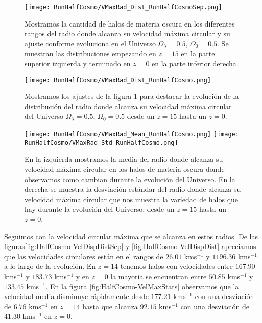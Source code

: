 \begin{figure}[H]
    \centering
    \texttt{[image: RunHalfCosmo/VMaxRad\_Dist\_RunHalfCosmoSep.png]}
    \caption[Radio donde se alcanza la velocidad máxima circular]{\footnotesize Mostramos la cantidad de halos de materia oscura en los diferentes rangos del radio donde alcanza su velocidad máxima circular y su ajuste conforme evoluciona en el Universo $\Omega_\lambda = 0.5$, $\Omega_0 = 0.5$. Se muestran las distribuciones empezando en $z=15$ en la parte superior izquierda y terminado en $z=0$ en la parte inferior derecha.}
    \label{fig:HalfCosmo-VMaxRadDistSep}
\end{figure}

\begin{figure}[H]
    \centering
    \texttt{[image: RunHalfCosmo/VMaxRad\_Dist\_RunHalfCosmo.png]}
    \caption[Distribución del radio donde se alcanza la velocidad máxima circular]{\footnotesize Mostramos los ajustes de la figura \ref{fig:HalfCosmo-VMaxRadDistSep} para destacar la evolución de la distribución del radio donde alcanza su velocidad máxima circular del Universo $\Omega_\lambda = 0.5$, $\Omega_0 = 0.5$ desde un $z=15$ hasta un $z=0$.}
    \label{fig:HalfCosmo-VMaxRadDist}
\end{figure}

\begin{figure}[H]
    \centering
    \texttt{[image: RunHalfCosmo/VMaxRad\_Mean\_RunHalfCosmo.png]}
    \texttt{[image: RunHalfCosmo/VMaxRad\_Std\_RunHalfCosmo.png]}
    \caption[Media y desviación estándar del Radio donde se alcanza la velocidad máxima circular]{\footnotesize En la izquierda mostramos la media del radio donde alcanza su velocidad máxima circular en los halos de materia oscura donde observamos como cambian durante la evolución del Universo. En la derecha se muestra la desviación estándar del radio donde alcanza su velocidad máxima circular que nos muestra la variedad de halos que hay durante la evolución del Universo, desde un $z=15$ hasta un $z=0$.}
    \label{fig:HalfCosmo-VMaxRadStats}
\end{figure}

Seguimos con la velocidad circular máxima que se alcanza en estos radios. De las figuras\ref{fig:HalfCosmo-VelDispDistSep} y \ref{fig:HalfCosmo-VelDispDist} apreciamos que las velocidades circulares están en el rangos de $26.01$ kms$^{-1}$ y $1196.36$ kms$^{-1}$ a lo largo de la evolución. En $z=14$ tenemos halos con velocidades entre $167.90$ kms$^{-1}$ y $183.73$ kms$^{-1}$ y en $z=0$ la mayoría se encuentran entre $50.85$ kms$^{-1}$ y $133.45$ kms$^{-1}$. En la figura \ref{fig:HalfCosmo-VelMaxStats} observamos que la velocidad media disminuye rápidamente desde $177.21$ kms$^{-1}$ con una desviación de $6.76$ kms$^{-1}$ en $z=14$ hasta que alcanza $92.15$ kms$^{-1}$ con una desviación de $41.30$ kms$^{-1}$ en $z=0$. 


